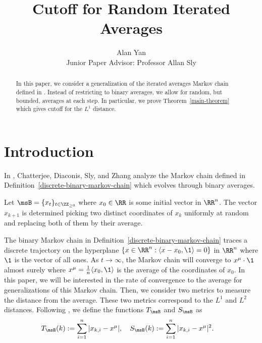 \documentclass[12pt]{article}
\title{Cutoff for Random Iterated Averages}
\author{Alan Yan \\ Junior Paper Advisor: Professor Allan Sly}
\begin{document}
\maketitle

\begin{abstract}
	In this paper, we consider a generalization of the iterated averages Markov chain defined in \cite{chatterjee2021phase}. Instead of restricting to binary averages, we allow for random, but bounded, averages at each step. In particular, we prove Theorem~\ref{main-theorem} which gives cutoff for the $L^1$ distance.  
\end{abstract}
\tableofcontents

\newpage 

\section{Introduction}

In \cite{chatterjee2021phase}, Chatterjee, Diaconis, Sly, and Zhang analyze the Markov chain defined in Definition~\ref{discrete-binary-markov-chain} which evolves through binary averages.  
\begin{defn} \label{discrete-binary-markov-chain}
	Let $\msB = \{x_t\}_{t \in \ZZ_{\geq 0}}$ where $x_0 \in \RR$ is some initial vector in $\RR^n$. The vector $x_{k+1}$ is determined picking two distinct coordinates of $x_k$ uniformly at random and replacing both of them by their average. 
\end{defn}

The binary Markov chain in Definition~\ref{discrete-binary-markov-chain} traces a discrete trajectory on the hyperplane $\{x \in \RR^n : \langle x - x_0, \1 \rangle = 0\}$ in $\RR^n$ where $\1$ is the vector of all ones. As $t \to \infty$, the Markov chain will converge to $x^\mu \cdot \1$ almost surely where $x^\mu = \frac{1}{n} \langle x_0, \1 \rangle$ is the average of the coordinates of $x_0$. In this paper, we will be interested in the rate of convergence to the average for generalizations of this Markov chain. Then, we consider two metrics to measure the distance from the average. These two metrics correspond to the $L^1$ and $L^2$ distances. Following \cite{chatterjee2021phase}, we define the functions $T_\msB$ and $S_\msB$ as 
\begin{align*}
	T_\msB(k) & := \sum_{i = 1}^n |x_{k, i} - x^\mu|, \quad S_\msB(k) := \sum_{i = 1}^n |x_{k, i} - x^\mu|^2.
\end{align*}
\end{document}
